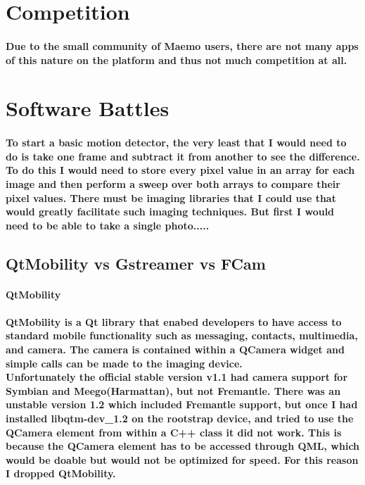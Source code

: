 \documentclass[11pt]{article} %
\begin{document}
\section{Competition}
\paragraph{Due to the small community of Maemo users, there are not many apps of this nature on the platform and thus not much competition at all.}

\section{Software Battles}
\paragraph{To start a basic motion detector, the very least that I would need to do is take one frame and subtract it from another to see the difference. To do this I would need to store every pixel value in an array for each image and then perform a sweep over both arrays to compare their pixel values. There must be imaging libraries that I could use that would greatly facilitate such imaging techniques. But first I would need to be able to take a single photo.....}

\subsection{QtMobility vs Gstreamer vs FCam}
\paragraph{\bf{QtMobility}}
\paragraph{QtMobility is a Qt library that enabed developers to have access to standard mobile functionality such as messaging, contacts, multimedia, and camera.  The camera is contained within a QCamera widget and simple calls can be made to the imaging device.
\\Unfortunately the official stable version v1.1 had camera support for Symbian and Meego(Harmattan), but not Fremantle. There was an unstable version 1.2 which included Fremantle support, but once I had installed libqtm-dev\_1.2 on the rootstrap device, and tried to use the QCamera element from within a C++ class it did not work. This is because the QCamera element has to be accessed through QML, which would be doable but would not be optimized for speed. For this reason I dropped QtMobility.
}
\pagebreak %
\end{document}
